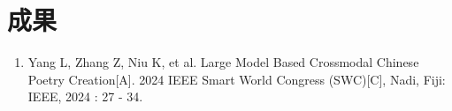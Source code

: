 
\appendix



















\chapter{成果}

\begin{enumerate}
    \item Yang L, Zhang Z, Niu K, et al. Large Model Based Crossmodal Chinese Poetry Creation[A]. 2024 IEEE Smart World Congress (SWC)[C], Nadi, Fiji: IEEE, 2024 : 27 - 34.
\end{enumerate}


